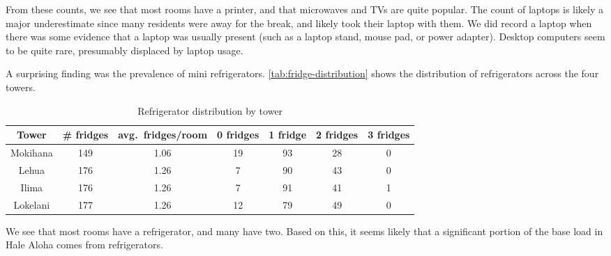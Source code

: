 From these counts, we see that most rooms have a printer, and that microwaves and TVs are quite popular. The count of laptops is likely a major underestimate since many residents were away for the break, and likely took their laptop with them. We did record a laptop when there was some evidence that a laptop was usually present (such as a laptop stand, mouse pad, or power adapter). Desktop computers seem to be quite rare, presumably displaced by laptop usage.

A surprising finding was the prevalence of mini refrigerators. \autoref{tab:fridge-distribution} shows the distribution of refrigerators across the four towers.

\begin{table}[htbp]
	\centering
		\begin{tabular}{| c || c | c | c | c | c | c |}
			\hline
			Tower & \# fridges & avg.\ fridges/room & 0 fridges & 1 fridge & 2 fridges & 3 fridges \tabularnewline \hline \hline
			
			Mokihana & 149 & 1.06 & 19 & 93 & 28 & 0  \tabularnewline \hline
			
			Lehua & 176 & 1.26 & 7 & 90 & 43 & 0 \tabularnewline \hline
			
			Ilima & 176 & 1.26 & 7 & 91 & 41 & 1 \tabularnewline \hline

			Lokelani & 177 & 1.26 & 12 & 79 & 49 & 0 \tabularnewline \hline

		\end{tabular}
	\caption{Refrigerator distribution by tower}
\label{tab:fridge-distribution}
\end{table}

We see that most rooms have a refrigerator, and many have two. Based on this, it seems likely that a significant portion of the base load in Hale Aloha comes from refrigerators.
